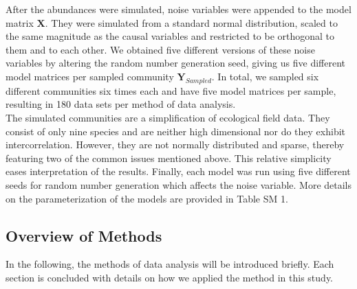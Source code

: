 \documentclass[a4paper,11pt]{article}
\begin{document}
		After the abundances were simulated, noise variables were appended to the model matrix $\mathbf{X}$.
		They were simulated from a standard normal distribution, scaled to the same magnitude as the causal variables and restricted to be orthogonal to them and to each other.  
	    We obtained five different versions of these noise variables by altering the random number generation seed,  giving us five different model matrices per sampled community $\mathbf{Y}_{Sampled}$.  
	    In total, we sampled six different communities six times each and have five model matrices per sample, resulting in 180 data sets per method of data analysis.\\
        The simulated communities are a simplification of ecological field data. 
        They consist of only nine species and are neither high dimensional nor do they exhibit intercorrelation.
        However, they are not normally distributed and sparse, thereby featuring two of the common issues mentioned above. 
        This relative simplicity eases interpretation of the results.
        Finally, each model was run using five different seeds for random number generation which affects the noise variable. 
        More details on the parameterization of the models are provided in Table SM 1.

    
    \subsection{Overview of Methods}
        
        In the following, the methods of data analysis will be introduced briefly. 
        Each section is concluded with details on how we applied the method in this study.  \\
\end{document}
